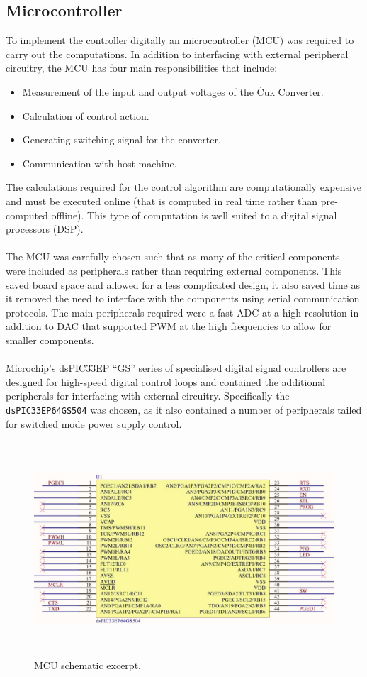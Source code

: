 \subsection{Microcontroller}
To implement the controller digitally an microcontroller (MCU) was required to carry out the computations. In addition to interfacing with external peripheral circuitry, the MCU has four main responsibilities that include:
\begin{itemize}
    \item Measurement of the input and output voltages of the \'Cuk Converter.
    \item Calculation of control action.
    \item Generating switching signal for the converter.
    \item Communication with host machine.
\end{itemize}
The calculations required for the control algorithm are computationally expensive and must be executed online (that is computed in real time rather than pre-computed offline). This type of computation is well suited to a digital signal processors (DSP).
\\ \\
The MCU was carefully chosen such that as many of the critical components were included as peripherals rather than requiring external components. This saved board space and allowed for a less complicated design, it also saved time as it removed the need to interface with the components using serial communication protocols. The main peripherals required were a fast ADC at a high resolution in addition to DAC that supported PWM at the high frequencies to allow for smaller components.
\\ \\
Microchip's dsPIC33EP ``GS'' series of specialised digital signal controllers are designed for high-speed digital control loops and contained the additional peripherals for interfacing with external circuitry. Specifically the \texttt{dsPIC33EP64GS504} was chosen, as it also contained a number of peripherals tailed for switched mode power supply control.
\begin{figure}
    \centering
    \includegraphics[height = 8cm]{figures/hardware/mcu_schematic.pdf}
    \caption{MCU schematic excerpt.}
    \label{fig:mcu_schematic}
\end{figure}

